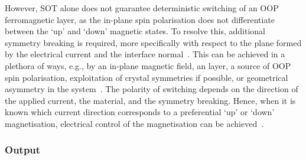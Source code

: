 However, SOT alone does not guarantee deterministic switching of an OOP ferromagnetic layer, as the in-plane spin polarisation does not differentiate between the `up' and `down' magnetic states.
To resolve this, additional symmetry breaking is required, more specifically with respect to the plane formed by the electrical current and the interface normal~\cite{SOT_Roadmap}.
This can be achieved in a plethora of ways, e.g., by an in-plane magnetic field, an  layer, a source of OOP spin polarisation, exploitation of crystal symmetries if possible, or geometrical asymmetry in the system~\cite{SOT_firstprinciplesCoPt,SOT_Roadmap}.
The polarity of switching depends on the direction of the applied current, the material, and the symmetry breaking.
Hence, when it is known which current direction corresponds to a preferential `up' or `down' magnetisation, electrical control of the magnetisation can be achieved~\cite{SOT_PMAinsulator}.

\subsubsection{Output}
